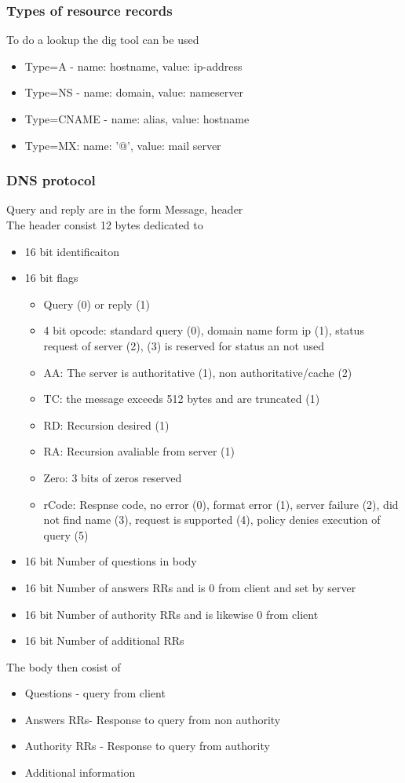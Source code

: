 \documentclass[12pt, a4paper]{article}
\begin{document}
			\subsubsection{Types of resource records}
				To do a lookup the dig tool can be used
				\begin{itemize}
					\item Type=A - name: hostname, value: ip-address
					\item Type=NS - name: domain, value: nameserver
					\item Type=CNAME - name: alias, value: hostname
					\item Type=MX: name: '@', value: mail server
				\end{itemize}
			\subsubsection{DNS protocol}
				Query and reply are in the form Message, header\\
				The header consist 12 bytes dedicated to
				\begin{itemize}
					\item 16 bit identificaiton
					\item 16 bit flags
					\begin{itemize}
						\item Query (0) or reply (1)
						\item 4 bit opcode: standard query (0), domain name form ip (1), status request of server (2), (3) is reserved for status an not used
						\item AA: The server is authoritative (1), non authoritative/cache (2)
						\item TC: the message exceeds 512 bytes and are truncated (1)
						\item RD: Recursion desired (1)
						\item RA: Recursion avaliable from server (1)
						\item Zero: 3 bits of zeros reserved
						\item rCode: Respnse code, no error (0), format error (1), server failure (2), did not find name (3), request is supported (4), policy denies execution of query (5)
					\end{itemize}
					\item 16 bit Number of questions in body
					\item 16 bit Number of answers RRs and is 0 from client and set by server 
					\item 16 bit Number of authority RRs and is likewise 0 from client
					\item 16 bit Number of additional RRs 
				\end{itemize}
				The body then cosist of
				\begin{itemize}
					\item Questions - query from client
					\item Answers RRs- Response to query from non authority
					\item Authority RRs -  Response to query from authority
					\item Additional information 
				\end{itemize}
\end{document}

